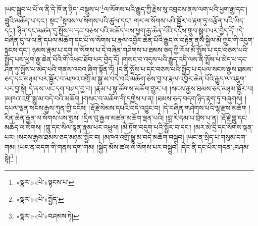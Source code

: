 །ཡང་སྒྲུབ་པ་པོ་ལ་ནི་དེ་ཁོ་ན་ཉིད་:བསྡུས་པ་\footnote{«སྣར་»«པེ་»སྟངས་པ་}ལ་སོགས་པའི་རྒྱུད་ཀྱི་རྗེས་སུ་འབྲངས་ནས་ལག་པའི་ཕྱག་རྒྱ་དང་། གླུའི་མཆོད་པ་དང་། སྟང་\footnote{«སྣར་»«པེ་»སྤྱོད་}སྟབས་ལ་སོགས་པའི་ཚུལ་དང་། གར་ལ་སོགས་པའི་སྦྱོར་བ་རྟག་ཏུ་བརྩོན་པའི་ཡིད་དང་། ཉིན་དང་མཚན་དུ་སྤྲོས་པ་དང་བཅས་པའི་མཆོད་པས་ཕྱག་རྒྱ་ཆེན་པོའི་དངོས་གྲུབ་སྒྲུབ་པར་བྱེད་དོ། །དེ་བཞིན་དུ་ལ་ལ་ནི་དཔལ་མཆོག་དང་པོ་ལ་སོགས་པ་རྣལ་འབྱོར་ཆེན་པོའི་རྒྱུད་ལ་བརྟེན་ནས་སྐྱིལ་མོ་ཀྲུང་གི་འདུག་སྟངས་དང་། ཉམས་རྣམ་པ་དགུ་ལ་སོགས་པ་དེ་བཞིན་གཤེགས་པ་ཐམས་ཅད་ཀྱི་རོལ་མོ་སྤྲོས་པ་དང་བཅས་པའི་སྤྱོད་པས་ཕྱག་རྒྱ་ཆེན་པོའི་གོ་འཕང་ཐོབ་པར་བྱེད་དོ། །གསང་བ་འདུས་པའི་རྒྱུད་འདི་ལས་ནི་སྤྲོས་པ་མེད་པ་དང་ཤིན་ཏུ་སྤྲོས་པ་མེད་པའི་གནས་འབའ་ཞིག་སྟོན་ཏོ། །ད་ནི་སྤྲོས་པ་དང་བཅས་པའི་སྤྱོད་པ་དཔལ་སངས་རྒྱས་ཐམས་ཅད་དང་མཉམ་པར་སྦྱོར་བ་མཁའ་འགྲོ་མ་སྒྱུ་མ་བདེ་བའི་མཆོག་ཅེས་བྱ་བ་རྣལ་འབྱོར་ཆེན་པོའི་རྒྱུད་ལ་འཇུག་པར་བྱ་སྟེ། དེ་ནས་ཡང་དག་བཤད་བྱ་བ། །རྣམ་པ་སྣ་ཚོགས་མཆོག་གྱུར་པ། །སངས་རྒྱས་ཐམས་ཅད་མཉམ་སྦྱོར་བ། །མཁའ་འགྲོ་སྒྱུ་མ་བདེ་བའི་མཆོག །གསང་བ་མཆོག་གི་དགྱེས་པ་ན། །ཐམས་ཅད་བདག་ཉིད་རྟག་ཏུ་བཞུགས། །དཔལ་ལྡན་སངས་རྒྱས་ཀུན་གྱི་དངོས། །རྡོ་རྗེ་སེམས་དཔའི་བདེ་འབྱུང་བ། །དེ་བཞིན་གཤེགས་པའི་ལྷ་རྫས་མཆོག །རིན་ཆེན་རྒྱན་ལ་སོགས་པས་སྤྲས། །དྲིལ་བུ་རྒྱལ་མཚན་མཆོག་ལྡན་པའི། །བླ་རེ་དམ་པ་བྲེས་པ་ན། །རྡོ་རྗེ་གླུ་དང་མཆོད་ལ་སོགས། །གླུ་དང་སིལ་སྙན་རྣམ་པར་འཕྲུལ། །མེ་ཏོག་བདུག་པའི་སྦྱོར་བ་དང་། །མར་མེ་དྲི་དང་སོགས་ལྡན་པར། །སངས་རྒྱས་ཐམས་ཅད་མཉམ་སྦྱོར་བ། །མཁའ་འགྲོ་སྒྱུ་མ་བདེ་མཆོག་བསྒྲུབ། །ཡང་ན་སྲིད་པ་གསུམ་དག་གམ། །ཡང་ན་བདག་གི་གནས་དག་གམ། །སྐྱེད་མོས་ཚལ་ལ་སོགས་པར་བསྒྲུབ། །དེར་ནི་དང་པོར་གདན་:བཤམ་སྟེ།\footnote{«སྣར་»«པེ་»བཤམས་ཏེ།} །
